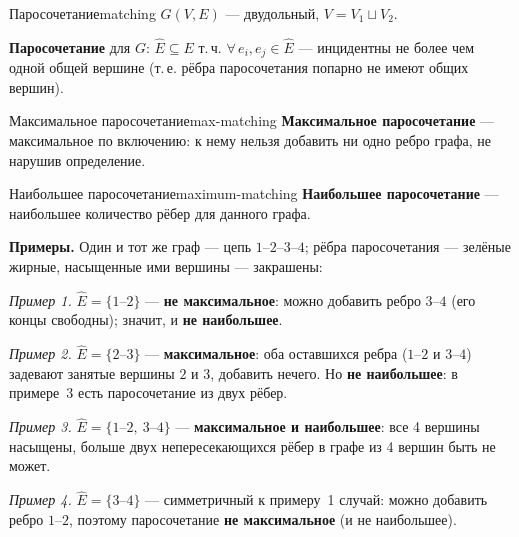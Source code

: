 \begin{defn}{Паросочетание}{matching}
$G(V, E)$ --- двудольный, $V = V_1 \sqcup V_2$.

\textbf{Паросочетание} для $G$: $\hat{E} \subseteq E$ т.\,ч. $\forall\, e_i, e_j \in \hat{E}$
--- инцидентны не более чем одной общей вершине
(т.\,е. рёбра паросочетания попарно не имеют общих вершин).
\end{defn}

\begin{defn}{Максимальное паросочетание}{max-matching}
\textbf{Максимальное паросочетание} --- максимальное по включению:
к нему нельзя добавить ни одно ребро графа, не нарушив определение.
\end{defn}

\begin{defn}{Наибольшее паросочетание}{maximum-matching}
\textbf{Наибольшее паросочетание} --- наибольшее количество рёбер для данного графа.
\end{defn}

\medskip
\noindent\textbf{Примеры.} Один и тот же граф --- цепь $1$--$2$--$3$--$4$;
рёбра паросочетания --- зелёные жирные, насыщенные ими вершины ---
закрашены:

\noindent\textit{Пример 1.} $\hat E = \{1\text{--}2\}$ --- \textbf{не
максимальное}: можно добавить ребро $3$--$4$ (его концы свободны);
значит, и \textbf{не наибольшее}.

\noindent\textit{Пример 2.} $\hat E = \{2\text{--}3\}$ ---
\textbf{максимальное}: оба оставшихся ребра ($1$--$2$ и $3$--$4$)
задевают занятые вершины $2$ и $3$, добавить нечего. Но \textbf{не
наибольшее}: в примере~3 есть паросочетание из двух рёбер.

\noindent\textit{Пример 3.} $\hat E = \{1\text{--}2,\ 3\text{--}4\}$ ---
\textbf{максимальное и наибольшее}: все 4 вершины насыщены, больше двух
непересекающихся рёбер в графе из 4 вершин быть не может.

\noindent\textit{Пример 4.} $\hat E = \{3\text{--}4\}$ --- симметричный
к примеру~1 случай: можно добавить ребро $1$--$2$, поэтому паросочетание
\textbf{не максимальное} (и не наибольшее).


